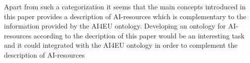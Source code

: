 Apart from such a categorization it seems that the main concepts
introduced in this paper provides a description of AI-resources which
is complementary to the information provided by the AI4EU ontology.
Developing an ontology for AI-resources according to the decription of
this paper would be an interesting task and it could integrated with
the AI4EU ontology in order to complement the description of
AI-resources 

